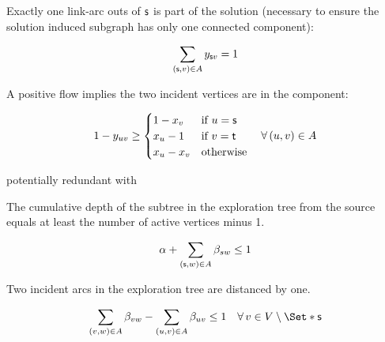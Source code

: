 Exactly one link-arc outs of \(\mathsf{s}{}\) is part of the solution (necessary to ensure the solution induced subgraph has only one connected component):
\begin{Constraint}
  \begin{equation}
    \sum_{(\source{}, v) \in A} y_{\source{} v} = 1 \label{pbf_iterbin:milp:cst:ccomp:one_outgoing_arc_from_source} %
  \end{equation}
\end{Constraint}

A positive flow implies the two incident vertices are in the component:
\begin{Constraint}
  \begin{equation}
    1 - y_{uv} \geq
    \begin{cases}
      1 - x_v & \text{if \(u = \source{}\)} \\
      x_u - 1 & \text{if \(v = \sink{}\)} \\
      x_u - x_v & \text{otherwise}
    \end{cases}
    \quad \forall (u, v) \in A
    \label{pbf_iterbin:milp:cst:ccomp:positive_flow_incident_vertices_in_component} %
  \end{equation}
\end{Constraint}
%
\begin{questionbox}
  potentially redundant with 
\end{questionbox}

The cumulative depth of the subtree in the exploration tree from the source equals at least the number of active vertices minus 1.
\begin{Constraint}
  \begin{align}
    \alpha + \sum_{(\source{}, w) \in A} \beta_{sw} \leq 1 \label{pbf_iterbin:milp:cst:ccomp:depth_of_tree_source} %
  \end{align}
\end{Constraint}

Two incident arcs in the exploration tree are distanced by one.
\begin{Constraint}
  \begin{align}
    \sum_{(v, w) \in A} \beta_{vw} - \sum_{(u, v) \in A} \beta_{uv} \leq 1 \quad \forall v \in V \setminus \Set*{\source{}}
    \label{pbf_iterbin:milp:cst:ccomp:depth_of_tree_incident_arcs} %
  \end{align}
\end{Constraint}

